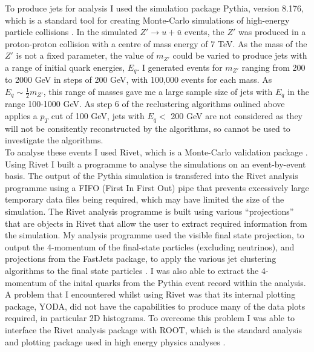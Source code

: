 \documentclass[a4paper,11pt, onecolumn]{article}
\begin{document}
  To produce jets for analysis I used the simulation package Pythia, version 8.176, which is a standard tool for creating Monte-Carlo simulations of high-energy particle 
  collisions  \cite{Pythia}. In the simulated $Z' \to u + \bar{u}$ events, the $Z'$ was produced in a proton-proton collision with a centre of mass energy 
  of 7 TeV. As the mass of the $Z'$ is not a fixed parameter, the value of $m_{Z'}$ could be varied to produce jets with a range of initial quark energies, 
  $E_q$. I generated events for $m_{Z'}$ ranging from 200 to 2000 GeV in steps of 200 GeV, with 100,000 events for each mass. As $E_q \sim \frac{1}{2}m_{Z'}$,
  this range of masses gave me a large sample size of jets with $E_q$ in the range 100-1000 GeV. As step 6 of the reclustering algorithms oulined above applies a 
  $p_T$ cut of 100 GeV, jets with $E_q <$ 200 GeV are not considered as they will not be consitently reconstructed by the algorithms, so cannot be used to investigate the algorithms. \\

  To analyse these events I used Rivet, which is a Monte-Carlo validation package \cite{Rivet}.
  Using Rivet I built a programme to analyse the simulations on an event-by-event basis. The output of the Pythia simulation is transfered 
  into the Rivet analysis programme using a FIFO (First In First Out) pipe that prevents excessively large temporary data files being required, 
  which may have limited the size of the simulation.
  The Rivet analysis programme is built using various ``projections'' that are objects in Rivet that allow the user to extract 
  required information from the simulation.
  My analysis programme used the visible final state projection, to output the 4-momentum of the final-state particles (excluding neutrinos), and projections from the 
  FastJets package, to apply the various jet clustering algorithms to the final state particles \cite{FastJets}.
  I was also able to extract the 4-momentum of the inital quarks from the Pythia event record within the analysis.\\

  A problem that I encountered whilst using Rivet was that its internal plotting package, YODA, did not have the capabilities to produce many of the data plots required,
  in particular 2D histograms. To overcome this problem I was able to interface the Rivet analysis package with ROOT, which is the standard analysis and plotting 
  package used in high energy physics analyses \cite{ROOT}. \\
\end{document}
